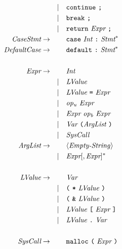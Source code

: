 \begin{align*}
                          &       & \SSmid  & \CCcontinue \ \CCscolon \\
                          &       & \SSmid  & \CCbreak \ \CCscolon \\
                          &       & \SSmid  & \CCreturn \ \Expression \ \CCscolon \\
  \CaseStatement          & \SSra &         & \CCcase \ \Integer \ \CCcolon \ \Statement^* \\
  \DefaultCaseStatement   & \SSra &         & \CCdefault \ \CCcolon \ \Statement^* \\
  \\
  \Expression             & \SSra &         & \Integer \\
                          &       & \SSmid  & \LeftValueExpression \\  
                          &       & \SSmid  & \LeftValueExpression \ \CCassign \ \Expression \\
                          &       & \SSmid  & \UnaryOperator \ \Expression \\
                          &       & \SSmid  & \Expression \ \BinaryOperator \ \Expression \\
                          &       & \SSmid  & \Variable \ \CClparen \ArgumentList \ \CCrparen \\
                          &       & \SSmid  & \SystemCall \\
  \ArgumentList           & \SSra &         & \CCEmptyString \\
                          &       & \SSmid  & \Expression [, \Expression]^* \\
  \\
  \LeftValueExpression    & \SSra &         & \Variable \\
                          &       & \SSmid  & \CClparen \ \CCasterisk \ \LeftValueExpression \ \CCrparen \\
                          &       & \SSmid  & \CClparen \ \CCampersand \ \LeftValueExpression \ \CCrparen \\
                          &       & \SSmid  & \LeftValueExpression \ \CClsbracket \ \Expression \ \CCrsbracket \\
                          &       & \SSmid  & \LeftValueExpression \ \CCperiod \ \Variable \\
  \\
  \SystemCall             & \SSra &         & \CCmalloc \ \CClparen \ \Expression \ \CCrparen \\

\end{align*}
